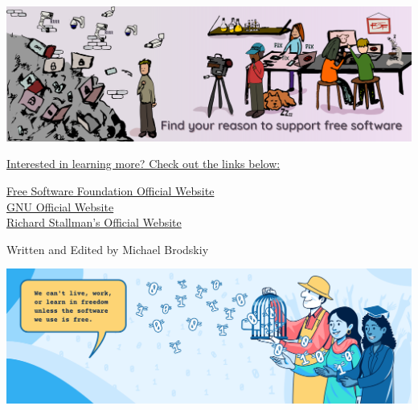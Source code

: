 \documentclass[12pt]{article}
\begin{document}
 \begin{center}
   \includegraphics[width=.9\textwidth]{Images/reason.png}
 \end{center}\newpage

 \begin{center}
   \vspace{10pt}
   \underline{Interested in learning more? Check out the links below:}
 \end{center}

 \begin{center}
   \href{fsf.org}{Free Software Foundation Official Website}\\\vspace{10pt}
   \href{gnu.org}{GNU Official Website}\\\vspace{10pt}
   \href{stallman.org}{Richard Stallman's Official Website}\\\vspace{10pt}
 \end{center}

 \begin{center}
   \tiny Written and Edited by Michael Brodskiy
 \end{center}

 \begin{center}
   \includegraphics[width=.9\textwidth]{Images/live.png}
 \end{center}
 
\end{document}
